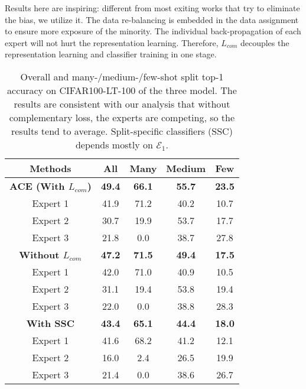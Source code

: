 Results here are inspiring: different from most exiting works that try to eliminate the bias, we utilize it. The data re-balancing is embedded in the data assignment to ensure more exposure of the minority. The individual back-propagation of each expert will not hurt the representation learning. Therefore, $L_{com}$ decouples the representation learning and classifier training in one stage.

\begin{table}[h]
\begin{center}
\small
\begin{tabular}{c|c|c c c}
\toprule[1.5pt]
\textbf{Methods} &  \textbf{All} & \textbf{Many} & \textbf{Medium} & \textbf{Few}\\\hline\hline
 \textbf{ACE (With $L_{com}$)} &  \textbf{49.4} & \textbf{66.1} & \textbf{55.7} & \textbf{23.5}\\
 \rowcolor{gray!10} Expert 1 & 41.9  & 71.2 & 40.2 & 10.7\\
 \rowcolor{gray!10} Expert 2 &  30.7 & 19.9 & 53.7 & 17.7\\
 \rowcolor{gray!10} Expert 3 &  21.8 & 0.0 & 38.7 & 27.8\\\hline
\textbf{Without $L_{com}$} & \textbf{47.2}& \textbf{71.5} & \textbf{49.4} &\textbf{17.5}\\
 \rowcolor{gray!10} Expert 1 &  42.0 & 71.0 & 40.9 & 10.5 \\
 \rowcolor{gray!10} Expert 2 &  31.1 & 19.4 & 53.8 & 19.4\\
 \rowcolor{gray!10} Expert 3 &  22.0 & 0.0 & 38.8 & 28.3\\
 \textbf{With SSC} & \textbf{43.4} & \textbf{65.1} & \textbf{44.4} & \textbf{18.0}\\
 \rowcolor{gray!10} Expert 1 &  41.6 & 68.2 & 41.2 & 12.1\\
 \rowcolor{gray!10} Expert 2 &  16.0 & 2.4 & 26.5 & 19.9\\
 \rowcolor{gray!10} Expert 3 &  21.4 &  0.0 & 38.6 & 26.7\\
\bottomrule[1.5pt]
\end{tabular}
\end{center}
\caption{Overall and many-/medium-/few-shot split top-1 accuracy on CIFAR100-LT-100 of the three model. The results are consistent with our analysis that without complementary loss, the experts are competing, so the results tend to average. Split-specific classifiers (SSC) depends mostly on $\mathcal{E}_1$.}
\label{tab:abs-lcom}
\end{table}

